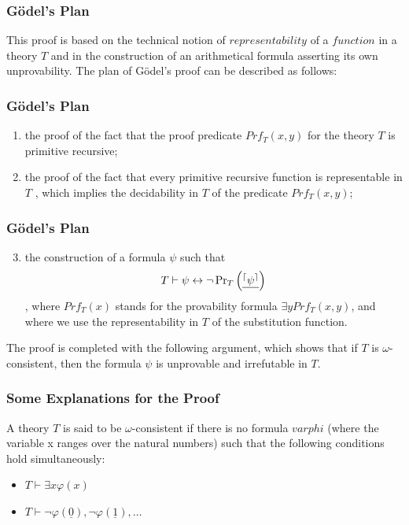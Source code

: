 \documentclass[aspectratio=169]{beamer}
\begin{document}
\begin{frame}
	\frametitle{Gödel's Plan}
	This proof is based on the technical notion of $representability$ of a $function$ in a theory $T$ and in the construction of an arithmetical formula asserting its own unprovability. The plan of Gödel's proof can be described as follows: \cite{bekl}
\end{frame}

\begin{frame}
	\frametitle{Gödel's Plan}
	\begin{enumerate}
		\item the proof of the fact that the proof predicate $Prf_T (x, y) $ for the theory $T$ is primitive recursive;
		\item the proof of the fact that every primitive recursive function is representable in $T$ , which implies the decidability in $T$ of the predicate $Prf_T (x, y);$
	\end{enumerate}
\end{frame}

\begin{frame}
	\frametitle{Gödel's Plan}
	\begin{enumerate}
	\setcounter{enumi}{2}
		\item the construction of a formula $\psi$ such that
		\[ T \vdash \psi \leftrightarrow \neg \operatorname{Pr}_{T}\left(\text{\underline{$^{\lceil} \psi^{\rceil}$}}\right) \]
		, where $Prf_T(x)$ stands for the provability formula $\exists y Prf_{T}(x, y)$, and where we
		use the representability in $T$ of the substitution function.
	\end{enumerate}
	The proof is completed with the following argument, which shows that if $T$ is $\omega$-consistent, then the formula $\psi$ is unprovable and irrefutable in $T$.
	\begin{flushright}
		\cite{bekl}
	\end{flushright}
\end{frame}

\begin{frame}
	\frametitle{Some Explanations for the Proof}
	\begin{Definition}
		A theory $T$ is said to be $\omega$-consistent if there is no formula $varphi$ (where the variable x ranges over the natural numbers) such that the following conditions hold simultaneously:
		\begin{itemize}
			\item $T \vdash \exists x \varphi(x)$
			\item $T \vdash \neg \varphi(\underline{0}), \neg \varphi(\underline{1}), \ldots$
		\end{itemize}
	\begin{flushright}
		\cite{bekl}
	\end{flushright}
	\end{Definition}
\end{frame}
\end{document}
